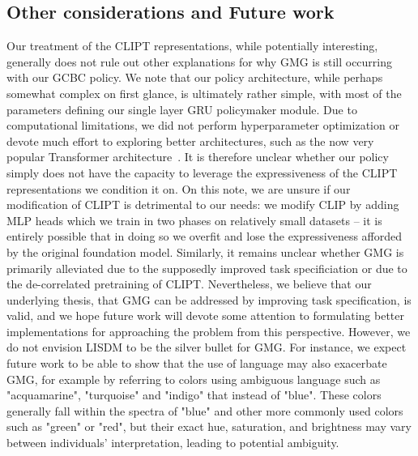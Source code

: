\documentclass[../main.tex]{subfiles}
\begin{document}
\subsection{Other considerations and Future work}

Our treatment of the CLIPT representations, while potentially interesting, generally does not rule
out other explanations for why GMG is still occurring with our GCBC policy. We note that our policy
architecture, while perhaps somewhat complex on first glance, is ultimately rather simple, with most
of the parameters defining our single layer GRU policymaker module. Due to computational
limitations, we did not perform hyperparameter optimization or devote much effort to exploring
better architectures, such as the now very popular Transformer
architecture~\citep{vaswani_attention_2017}. It is therefore unclear whether our policy simply does
not have the capacity to leverage the expressiveness of the CLIPT representations we condition it
on. On this note, we are unsure if our modification of CLIPT is detrimental to our needs: we modify
CLIP by adding MLP heads which we train in two phases on relatively small datasets -- it is entirely
possible that in doing so we overfit and lose the expressiveness afforded by the original foundation
model. Similarly, it remains unclear whether GMG is primarily alleviated due to the supposedly improved task specificiation or due to the de-correlated pretraining of CLIPT. Nevertheless, we believe that our underlying thesis, that GMG can be addressed by improving task
	specification, is valid, and we hope future work will devote some attention to formulating better
implementations for approaching the problem from this perspective. However, we do not
envision LISDM to be the silver bullet for GMG. For instance, we expect future work to be able to
show that the use of language may also exacerbate GMG, for example by referring to colors using
ambiguous language such as "acquamarine", "turquoise" and "indigo" that instead of "blue". These
colors generally fall within the spectra of "blue" and other more commonly used colors such as
"green" or "red", but their exact hue, saturation, and brightness may vary between individuals'
interpretation, leading to potential ambiguity.
\end{document}
